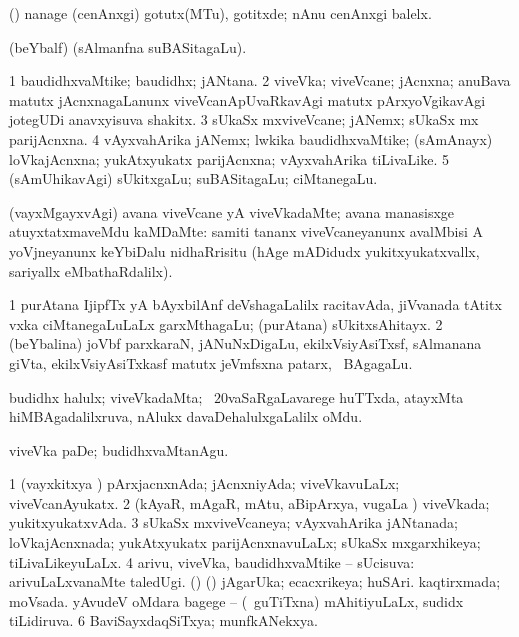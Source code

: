 {{{{{{\bentry
{}
  \gl{\akirx}\bmng
(\pArxparx) nanage (cenAnxgi) gotutx(MTu), gotitxde; nAnu cenAnxgi balelx. 
\emng
\eentry

\bentry
{}
 \gl{\saMkiSx}\bmng
{} 
\emng
\eentry

\bentry
{}
 \gl{\saMkiSx}\bmng
{} (beYbalf) (sAlmanfna suBASitagaLu). 
\emng
\eentry

\bentry
{}
  \gl{\nA}\bmng
\bnum
\num{1} baudidhxvaMtike; baudidhx; jANtana. 
\num{2} viveVka; viveVcane; jAcnxna; anuBava matutx jAcnxnagaLanunx viveVcanApUvaRkavAgi matutx pArxyoVgikavAgi jotegUDi anavxyisuva shakitx. 
\num{3} sUkaSx mxviveVcane; jANemx; sUkaSx mx parijAcnxna. 
\num{4} vAyxvahArika jANemx; lwkika baudidhxvaMtike; (sAmAnayx) loVkajAcnxna; yukAtxyukatx parijAcnxna; vAyxvahArika tiLivaLike. 
\num{5} (sAmUhikavAgi) sUkitxgaLu; suBASitagaLu; ciMtanegaLu. 
\enum
\emng

\noindent 
\gl{\pagu}
\bmng
{} (vayxMgayxvAgi) avana viveVcane yA viveVkadaMte; avana manasisxge atuyxtatxmaveMdu kaMDaMte:  samiti tananx viveVcaneyanunx avalMbisi A yoVjneyanunx keYbiDalu nidhaRrisitu (hAge mADidudx yukitxyukatxvallx, sariyallx eMbathaRdalilx). 
\emng
\eentry

\bentry
{}
 \gl{\nA}\bmng
\bnum
\num{1} purAtana IjipfTx yA bAyxbilAnf deVshagaLalilx racitavAda, jiVvanada tAtitx vxka ciMtanegaLuLaLx garxMthagaLu; (purAtana) sUkitxsAhitayx. 
\num{2} (beYbalina) joVbf parxkaraN, jANuNxDigaLu, ekilxVsiyAsiTxsf, sAlmanana giVta, ekilxVsiyAsiTxkasf matutx jeVmfsxna patarx, \mo\ BAgagaLu. 
\enum
\emng
\eentry

\bentry
{} 
\gl{\nA}
\expl{}
\bmng
budidhx halulx; viveVkadaMta; \sA\ $20$vaSaRgaLavarege huTTxda, atayxMta hiMBAgadalilxruva, nAlukx davaDehalulxgaLalilx oMdu. 
\emng

\noindent
\gl{\pagu}
\bmng
{} viveVka paDe; budidhxvaMtanAgu. 
\emng
\eentry

\bentry
{} 
\gl{\gu}
\expl{}
\bmng
\bnum
\num{1} (vayxkitxya \vi) pArxjacnxnAda; jAcnxniyAda; viveVkavuLaLx; viveVcanAyukatx. 
\num{2} (kAyaR, mAgaR, mAtu, aBipArxya, \mo vugaLa \vi) viveVkada; yukitxyukatxvAda. 
\num{3} sUkaSx mxviveVcaneya; vAyxvahArika jANtanada; loVkajAcnxnada; yukAtxyukatx parijAcnxnavuLaLx; sUkaSx mxgarxhikeya; tiLivaLikeyuLaLx. 
\num{4} arivu, viveVka, baudidhxvaMtike -- sUcisuva:  arivuLaLxvanaMte taledUgi. 
 (\ame) (\AmA) 
\banum
{} jAgarUka; ecacxrikeya; huSAri. 
 kaqtirxmada; moVsada. 
 yAvudeV oMdara bagege -- (\sA\ guTiTxna) mAhitiyuLaLx, sudidx tiLidiruva. 
\eanum
\numie
\num{6} BaviSayxdaqSiTxya; munfkANekxya. 
\enum
\emng

}}}}}}
